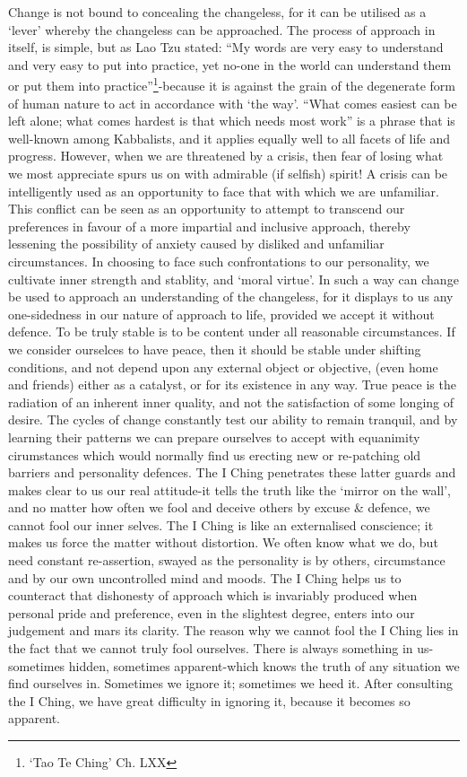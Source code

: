\documentclass[11pt]{book}
\begin{document}
Change is not bound to concealing the changeless, for it can be utilised as a `lever' whereby the changeless can be approached. The process of approach in itself, is simple, but as Lao Tzu stated: ``My words are very easy to understand and very easy to put into practice, yet no-one in the world can understand them or put them into practice''\footnote{`Tao Te Ching' Ch. LXX}-because it is against the grain of the degenerate form of human nature to act in accordance with `the way'. ``What comes easiest can be left alone; what comes hardest is that which needs most work'' is a phrase that is well-known among Kabbalists, and it applies equally well to all facets of life and progress. However, when we are threatened by a crisis, then fear of losing what we most appreciate spurs us on with admirable (if selfish) spirit! A crisis can be intelligently used as an opportunity to face that with which we are unfamiliar. This conflict can be seen as an opportunity to attempt to transcend our preferences in favour of a more impartial and inclusive approach, thereby lessening the possibility of anxiety caused by disliked and unfamiliar circumstances. In choosing to face such confrontations to our personality, we cultivate inner strength and stablity, and `moral virtue'. In such a way can change be used to approach an understanding of the changeless, for it displays to us any one-sidedness in our nature of approach to life, provided we accept it without defence. To be truly stable is to be content under all reasonable circumstances. If we consider ourselces to have peace, then it should be stable under shifting conditions, and not depend upon any external object or objective, (even home and friends) either as a catalyst, or for its existence in any way. True peace is the radiation of an inherent inner quality, and not the satisfaction of some longing of desire. The cycles of change constantly test our ability to remain tranquil, and by learning their patterns we can prepare ourselves to accept with equanimity cirumstances which would normally find us erecting new or re-patching old barriers and personality defences. The I Ching penetrates these latter guards and makes clear to us our real attitude-it tells the truth like the `mirror on the wall', and no matter how often we fool and deceive others by excuse \& defence, we cannot fool our inner selves. The I Ching is like an externalised conscience; it makes us force the matter without distortion. We often know what we do, but need constant re-assertion, swayed as the personality is by others, circumstance and by our own uncontrolled mind and moods. The I Ching helps us to counteract that dishonesty of approach which is invariably produced when personal pride and preference, even in the slightest degree, enters into our judgement and mars its clarity. The reason why we cannot fool the I Ching lies in the fact that we cannot truly fool ourselves. There is always something in us-sometimes hidden, sometimes apparent-which knows the truth of any situation we find ourselves in. Sometimes we ignore it; sometimes we heed it. After consulting the I Ching, we have great difficulty in ignoring it, because it becomes so apparent.
\end{document}
